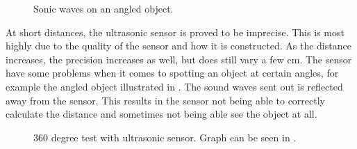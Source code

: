 \begin{figure}[H]
     \caption{\label{fig:angled_object} Sonic waves on an angled object.}
\end{figure}

At short distances, the ultrasonic sensor is proved to be imprecise. This is most highly due to the quality of the sensor and how it is constructed. As the distance increases, the precision increases as well, but does still vary a few cm. The sensor have some problems when it comes to spotting an object at certain angles, for example the angled object illustrated in . The sound waves sent out is reflected away from the sensor. This results in the sensor not being able to correctly calculate the distance and sometimes not being able see the object at all.

\begin{figure}[H]
     \caption{\label{fig:sonar-test-drawing} 360 degree test with ultrasonic sensor. Graph can be seen in .}
\end{figure}

